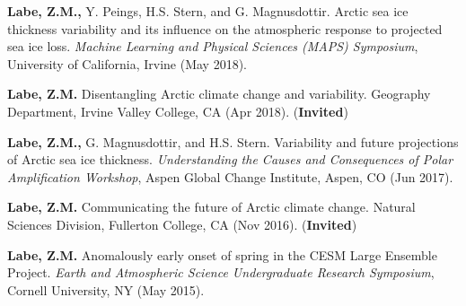 \documentclass[margin,line,palatino,courier,10pt]{res}
\begin{document}
\begin{resume}
\begin{etaremune}[leftmargin=0in,topsep=0in,parsep=0in]
\item \textbf{Labe, Z.M.,} Y. Peings, H.S. Stern, and G. Magnusdottir. Arctic sea ice thickness variability and its influence on the atmospheric response to projected sea ice loss. \textit{Machine Learning and Physical Sciences (MAPS) Symposium}, University of California, Irvine (May 2018). 
\item \textbf{Labe, Z.M.} Disentangling Arctic climate change and variability. Geography Department, Irvine Valley College, CA (Apr 2018). (\textbf{Invited})
\item \textbf{Labe, Z.M.,} G. Magnusdottir, and H.S. Stern. Variability and future projections of Arctic sea ice thickness. \textit{Understanding the Causes and Consequences of Polar Amplification Workshop}, Aspen Global Change Institute, Aspen, CO (Jun 2017). 
\item \textbf{Labe, Z.M.} Communicating the future of Arctic climate change. Natural Sciences Division, Fullerton College, CA (Nov 2016). (\textbf{Invited})
\item \textbf{Labe, Z.M.} Anomalously early onset of spring in the CESM Large Ensemble Project. \textit{Earth and Atmospheric Science Undergraduate Research Symposium}, Cornell University, NY (May 2015). 

\end{etaremune}


\end{resume}
\end{document}
